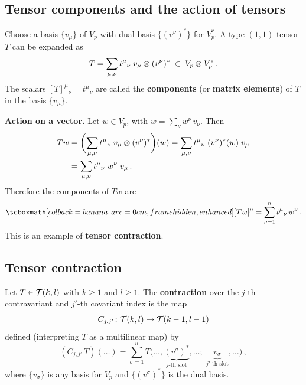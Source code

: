 \subsection{Tensor components and the action of tensors}%
\label{sec:tensor-components}

Choose a basis $\{v_\mu\}$ of $V_p$ with dual basis
$\{(v^\nu)^*\}$ for $V_p^*$.  A type-$(1,1)$ tensor $T$ can be
expanded as
\begin{equation}\label{eq:type11-expansion}
  T = \sum_{\mu,\nu} t^\mu{}_\nu\; v_\mu \otimes (v^\nu)^*
  \;\in\; V_p\otimes V_p^*\,.
\end{equation}
The scalars $[T]^\mu{}_\nu = t^\mu{}_\nu$ are called the
\textbf{components} (or \textbf{matrix elements}) of $T$ in the
basis $\{v_\mu\}$.

\medskip
\noindent\textbf{Action on a vector.}\;
Let $w\in V_p$, with $w = \sum_\nu w^\nu\, v_\nu$.  Then
\begin{align}
  Tw &= \biggl(\sum_{\mu,\nu} t^\mu{}_\nu\; v_\mu\otimes (v^\nu)^*
        \biggr)(w)
      = \sum_{\mu,\nu} t^\mu{}_\nu\; (v^\nu)^*(w)\; v_\mu
        \notag\\
     &= \sum_{\mu,\nu} t^\mu{}_\nu\; w^\nu\; v_\mu\,.
        \label{eq:tensor-action}
\end{align}
Therefore the components of $Tw$ are
\begin{equation}\label{eq:tensor-action-components}
  \eqbox{[Tw]^\mu = \sum_{\nu=1}^{n} t^\mu{}_\nu\, w^\nu}\,.
\end{equation}
This is an example of \textbf{tensor contraction}.

\subsection{Tensor contraction}\label{sec:contraction}

\begin{definition}[Contraction]\label{def:contraction}
  Let $T\in\mathcal{T}(k,l)$ with $k\geq 1$ and $l\geq 1$.  The
  \textbf{contraction} over the $j$-th contravariant and $j'$-th
  covariant index is the map
  \[
    C_{j,j'}\colon \mathcal{T}(k,l) \to \mathcal{T}(k-1,l-1)
  \]
  defined (interpreting $T$ as a multilinear map) by
  \begin{equation}\label{eq:contraction}
    (C_{j,j'}\, T)(\dots) =
    \sum_{\sigma=1}^{n}
      T\bigl(\dots,\underbrace{(v^\sigma)^*}_{j\text{-th slot}},
             \dots;\;
             \underbrace{v_\sigma}_{j'\text{-th slot}},\dots\bigr)\,,
  \end{equation}
  where $\{v_\sigma\}$ is any basis for $V_p$ and $\{(v^\sigma)^*\}$
  is the dual basis.
\end{definition}

